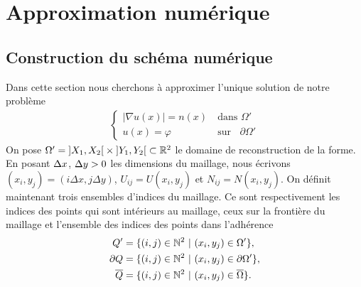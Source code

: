 \section{Approximation numérique}
\subsection{Construction du schéma numérique}

Dans cette section nous cherchons à approximer l'unique solution de notre problème
\begin{align*}
    \left\{\begin{array}{ll}
         \mathopen{}\left|\nabla u(x)\right|\mathclose{}=n(x)& \ \text{dans } \Omega'\\  
         u(x)=\varphi& \ \text{sur } \mathop{}\!{\partial}\Omega'
    \end{array}
    \right.
\end{align*}
On pose $\Omega' = \mathopen{}\left]X_1,X_2\right[\mathclose{} \times \mathopen{}\left]Y_1,Y_2\right[\mathclose{} \subset \mathbb{R}^2$ le domaine de reconstruction de la forme. En posant $\Delta x$, $\Delta y > 0$ les dimensions du maillage, nous écrivons $(x_i,y_j)=(i\Delta x,j\Delta y)$, $U_{ij}=U(x_i,y_j)$ et $N_{ij}=N(x_i,y_j)$. On définit maintenant trois ensembles d'indices du maillage. Ce sont respectivement les indices des points qui sont intérieurs au maillage, ceux sur la frontière du maillage et l'ensemble des indices des points dans l'adhérence
\begin{align*}
    Q' &= \{ (i,j)\in \mathbb{N}^2 \ |\ (x_i,y_j)\in \Omega' \},\\
    \mathop{}\!{\partial} Q &= \{ (i,j)\in \mathbb{N}^2 \ |\ (x_i,y_j)\in \mathop{}\!{\partial} \Omega' \},\\
    \overline{Q} &= \{(i, j) \in \mathbb{N}^2 \ | \ (x_i, y_j) \in \overline{\Omega} \}.
\end{align*}

